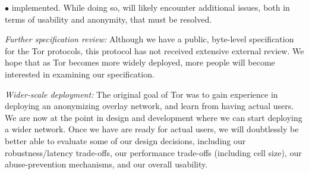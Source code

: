 \documentclass[times,10pt,twocolumn]{article}
\newenvironment{tightlist}{\begin{list}{$\bullet$}{
  \setlength{\itemsep}{0mm}
    \setlength{\parsep}{0mm}
    }}{\end{list}}
\begin{document}
\begin{tightlist}
  implemented.  While doing so, will likely encounter additional
  issues, both in terms of usability and anonymity, that must be
  resolved.
\item \emph{Further specification review:} Although we have a public,
  byte-level specification for the Tor protocols, this protocol has
  not received extensive external review.  We hope that as Tor
  becomes more widely deployed, more people will become interested in
  examining our specification.
\item \emph{Wider-scale deployment:} The original goal of Tor was to
  gain experience in deploying an anonymizing overlay network, and
  learn from having actual users.  We are now at the point in design
  and development where we can start deploying a wider network.  Once
  we have are ready for actual users, we will doubtlessly be better
  able to evaluate some of our design decisions, including our
  robustness/latency trade-offs, our performance trade-offs (including
  cell size), our abuse-prevention mechanisms, and
  our overall usability.
\end{tightlist}






\end{document}
